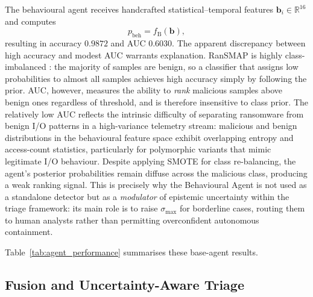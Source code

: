 \documentclass[lettersize,journal]{IEEEtran}
\begin{document}
The behavioural agent receives handcrafted statistical–temporal features \(\mathbf{b}_i \in \mathbb{R}^{16}\) and computes
\begin{equation}
p_{\mathrm{beh}} = f_{\mathrm{B}}(\mathbf{b}),
\label{eq:pbeh}
\end{equation}
resulting in accuracy \(0.9872\) and AUC \(0.6030\). 
\cbstart
The apparent discrepancy between high
accuracy and modest AUC warrants explanation. RanSMAP is highly class-imbalanced
\cbend
: the majority
of samples are benign, so a classifier that assigns low probabilities to almost all samples
achieves high accuracy simply by following the prior. AUC, however, measures the ability to
\emph{rank} malicious samples above benign ones regardless of threshold, and is therefore
insensitive to class prior. The relatively low AUC reflects the intrinsic difficulty of
separating ransomware from benign I/O patterns in a high-variance telemetry stream: malicious
and benign distributions in the behavioural feature space exhibit overlapping entropy and
access-count statistics, particularly for polymorphic variants that mimic legitimate I/O
behaviour. Despite applying SMOTE for class re-balancing, the agent's posterior probabilities
remain diffuse across the malicious class, producing a weak ranking signal. This is precisely
why the Behavioural Agent is not used as a standalone detector but as a \emph{modulator} of
epistemic uncertainty within the triage framework: 
\cbstart
its main role is to raise $\sigma_{\max}$
for borderline cases, routing them to human analysts rather than permitting overconfident
autonomous containment.
\cbend


Table~\ref{tab:agent_performance} summarises these base-agent results.

\begin{table}[ht]
\centering
{}
\caption{Performance of the individual agents prior to fusion.}
\label{tab:agent_performance}
\end{table}

\subsection{Fusion and Uncertainty-Aware Triage}
\end{document}
